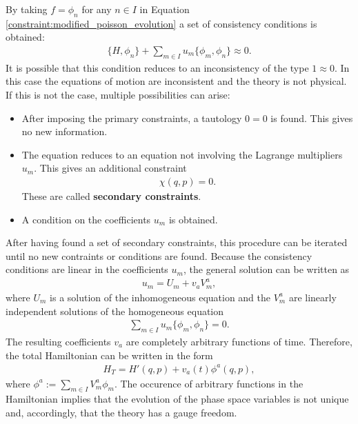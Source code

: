     \begin{property}
        By taking $f=\phi_n$ for any $n\in I$ in Equation \ref{constraint:modified_poisson_evolution} a set of consistency conditions is obtained:
        \begin{gather}
            \{H,\phi_n\} + \sum_{m\in I}u_m\{\phi_m,\phi_n\}\approx 0.
        \end{gather}
        It is possible that this condition reduces to an inconsistency of the type $1\approx0$. In this case the equations of motion are inconsistent and the theory is not physical. If this is not the case, multiple possibilities can arise:
        \begin{itemize}
            \item After imposing the primary constraints, a tautology $0=0$ is found. This gives no new information.
            \item The equation reduces to an equation not involving the Lagrange multipliers $u_m$. This gives an additional constraint
                \begin{gather}
                    \chi(q,p)=0.
                \end{gather}
                These are called \textbf{secondary constraints}.
            \item A condition on the coefficients $u_m$ is obtained.
        \end{itemize}
        After having found a set of secondary constraints, this procedure can be iterated until no new contraints or conditions are found. Because the consistency conditions are linear in the coefficients $u_m$, the general solution can be written as
        \begin{gather}
            u_m = U_m + v_aV^a _m,
        \end{gather}
        where $U_m$ is a solution of the inhomogeneous equation and the $V^a_m$ are linearly independent solutions of the homogeneous equation
        \begin{gather}
            \sum_{m\in I}u_m\{\phi_m,\phi_n\} = 0.
        \end{gather}
        The resulting coefficients $v_a$ are completely arbitrary functions of time. Therefore, the total Hamiltonian can be written in the form
        \begin{gather}
            H_T = H'(q,p) + v_a(t)\phi^a(q,p),
        \end{gather}
        where $\phi^a := \sum_{m\in I}V^a_m\phi_m$. The occurence of arbitrary functions in the Hamiltonian implies that the evolution of the phase space variables is not unique and, accordingly, that the theory has a gauge freedom.
    \end{property}

